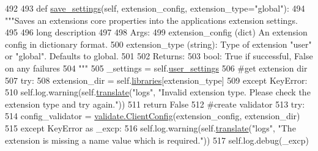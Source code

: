 \begin{DoxyCode}
492 
493     \textcolor{keyword}{def }\hyperlink{classcommotion__client_1_1utils_1_1extension__manager_1_1ExtensionManager_a048d2495f31a2637f67ed1b759f728a4}{save\_settings}(self, extension\_config, extension\_type="global"):
494         \textcolor{stringliteral}{"""Saves an extensions core properties into the applications extension settings.}
495 \textcolor{stringliteral}{        }
496 \textcolor{stringliteral}{        long description}
497 \textcolor{stringliteral}{        }
498 \textcolor{stringliteral}{        Args:}
499 \textcolor{stringliteral}{          extension\_config (dict) An extension config in dictionary format.}
500 \textcolor{stringliteral}{          extension\_type (string): Type of extension "user" or "global". Defaults to global.}
501 \textcolor{stringliteral}{        }
502 \textcolor{stringliteral}{        Returns:}
503 \textcolor{stringliteral}{          bool: True if successful, False on any failures}
504 \textcolor{stringliteral}{        """}
505         \_settings = self.\hyperlink{classcommotion__client_1_1utils_1_1extension__manager_1_1ExtensionManager_a0fa8b2be1171ded73629a01c50472d34}{user\_settings}
506         \textcolor{comment}{#get extension dir}
507         \textcolor{keywordflow}{try}:
508             extension\_dir = self.\hyperlink{classcommotion__client_1_1utils_1_1extension__manager_1_1ExtensionManager_a28e035496b4d544179f934b3c401c0c1}{libraries}[extension\_type]
509         \textcolor{keywordflow}{except} KeyError:
510             self.log.warning(self.\hyperlink{classcommotion__client_1_1utils_1_1extension__manager_1_1ExtensionManager_a2cfd032ca383c3fd6f0f52b99b6dd67c}{translate}(\textcolor{stringliteral}{"logs"}, \textcolor{stringliteral}{"Invalid extension type. Please check the
       extension type and try again."}))
511             \textcolor{keywordflow}{return} \textcolor{keyword}{False}
512         \textcolor{comment}{#create validator}
513         \textcolor{keywordflow}{try}:
514             config\_validator = \hyperlink{classcommotion__client_1_1utils_1_1validate_1_1ClientConfig}{validate.ClientConfig}(extension\_config, extension\_dir)
515         \textcolor{keywordflow}{except} KeyError \textcolor{keyword}{as} \_excp:
516             self.log.warning(self.\hyperlink{classcommotion__client_1_1utils_1_1extension__manager_1_1ExtensionManager_a2cfd032ca383c3fd6f0f52b99b6dd67c}{translate}(\textcolor{stringliteral}{"logs"}, \textcolor{stringliteral}{"The extension is missing a name value which
       is required."}))
517             self.log.debug(\_excp)

\end{DoxyCode}
